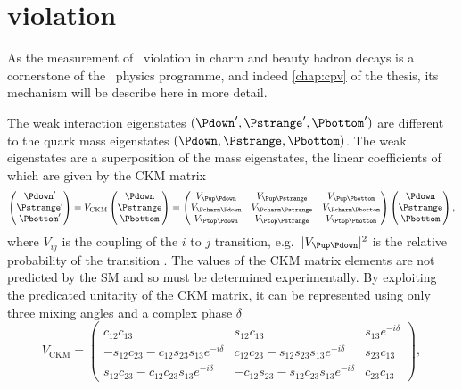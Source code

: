 \section{\texorpdfstring{\CP}{CP} violation}
\label{chap:intro:sm:cp}

As the measurement of \CP\ violation in charm and beauty hadron decays is a 
cornerstone of the \lhcb\ physics programme, and indeed \cref{chap:cpv} of the 
thesis, its mechanism will be describe here in more detail.

The weak interaction eigenstates $(\Pdown', \Pstrange', \Pbottom')$ are 
different to the quark mass eigenstates $(\Pdown, \Pstrange, \Pbottom)$.
The weak eigenstates are a superposition of the mass eigenstates, the linear 
coefficients of which are given by the \ac{CKM} matrix
\begin{equation}
  \begin{pmatrix} \Pdown' \\ \Pstrange' \\ \Pbottom' \end{pmatrix}
  =
  V_{\text{CKM}}\begin{pmatrix} \Pdown \\ \Pstrange \\ \Pbottom \end{pmatrix}
  =
  \begin{pmatrix}
    \Vud & \Vus & \Vub \\
    \Vcd & \Vcs & \Vcb \\
    \Vtd & \Vts & \Vtb
  \end{pmatrix}
  \begin{pmatrix} \Pdown \\ \Pstrange \\ \Pbottom \end{pmatrix},
\end{equation}
where $V_{ij}$ is the coupling of the $i$ to $j$ transition, e.g.\ $|\Vud|^{2}$ 
is the relative probability of the transition \decay{\Pdown}{\Pup}.
The values of the \ac{CKM} matrix elements are not predicted by the \ac{SM} and 
so must be determined experimentally.
By exploiting the predicated unitarity of the \ac{CKM} matrix, it can be 
represented using only three mixing angles and a complex phase $\delta$
\begin{equation}
  V_{\textrm{CKM}} =
  \begin{pmatrix}
    c_{12}c_{13} & s_{12}c_{13} & s_{13}e^{-i\delta} \\
    -s_{12}c_{23} - c_{12}s_{23}s_{13}e^{-i\delta} & c_{12}c_{23} - 
    s_{12}s_{23}s_{13}e^{-i\delta} & s_{23}c_{13} \\
    s_{12}c_{23} - c_{12}c_{23}s_{13}e^{-i\delta} & -c_{12}s_{23} - 
    s_{12}c_{23}s_{13}e^{-i\delta} & c_{23}c_{13}
  \end{pmatrix},
\end{equation}
